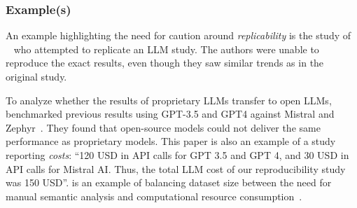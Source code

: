 \subsubsection{Example(s)}

An example highlighting the need for caution around \emph{replicability} is the study of \citeauthor{DBLP:conf/sigir-ap/StaudingerKPLH24}~\cite{DBLP:conf/sigir-ap/StaudingerKPLH24} who attempted to replicate an LLM study.
The authors were unable to reproduce the exact results, even though they saw similar trends as in the original study.

To analyze whether the results of proprietary LLMs transfer to open LLMs, \citeauthor{DBLP:conf/sigir-ap/StaudingerKPLH24} benchmarked previous results using GPT-3.5 and GPT4 against Mistral and Zephyr~\cite{DBLP:conf/sigir-ap/StaudingerKPLH24}.
They found that open-source models could not deliver the same performance as proprietary models. %
This paper is also an example of a study reporting \emph{costs}: \enquote{120 USD in API calls for GPT 3.5 and GPT 4, and 30 USD in API calls for Mistral AI. Thus, the total LLM cost of our reproducibility study was 150 USD}.
\citeauthor{tinnessoftware} is an example of balancing dataset size between the need for manual semantic analysis and computational resource consumption~\cite{tinnessoftware}.

